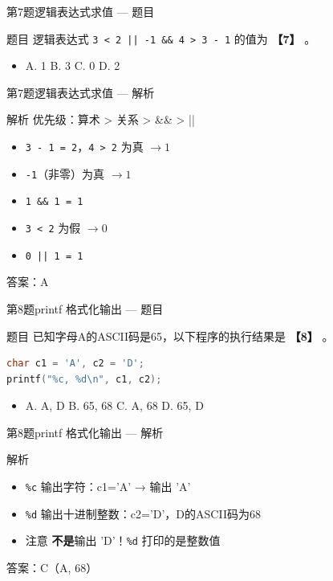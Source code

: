 \begin{frame}{第7题}{逻辑表达式求值 --- 题目}
    \begin{exampleblock}{题目}
        逻辑表达式 \texttt{3 < 2 || -1 \&\& 4 > 3 - 1} 的值为 \textbf{【7】} 。
        \begin{itemize}
            \item A. 1 \quad B. 3 \quad C. 0 \quad D. 2
        \end{itemize}
    \end{exampleblock}
\end{frame}

\begin{frame}{第7题}{逻辑表达式求值 --- 解析}
    \begin{alertblock}{解析}
        \footnotesize 优先级：算术 > 关系 > \&\& > ||
        \begin{itemize}
            \setlength{\itemsep}{0pt}
            \item \texttt{3 - 1 = 2}，\texttt{4 > 2} 为真 $\to 1$
            \item \texttt{-1}（非零）为真 $\to 1$
            \item \texttt{1 \&\& 1 = 1}
            \item \texttt{3 < 2} 为假 $\to 0$
            \item \texttt{0 || 1 = 1}
        \end{itemize}
        {\color{highlight}答案：A}
    \end{alertblock}
\end{frame}

\begin{frame}[fragile]{第8题}{printf 格式化输出 --- 题目}
    \begin{exampleblock}{题目}
        已知字母A的ASCII码是65，以下程序的执行结果是 \textbf{【8】} 。
    \end{exampleblock}

    \begin{lstlisting}[language=C, basicstyle=\footnotesize\ttfamily]
char c1 = 'A', c2 = 'D';
printf("%c, %d\n", c1, c2);
\end{lstlisting}
    \begin{itemize}
        \item A. A, D \quad B. 65, 68 \quad C. A, 68 \quad D. 65, D
    \end{itemize}
\end{frame}

\begin{frame}{第8题}{printf 格式化输出 --- 解析}
    \begin{alertblock}{解析}
        \small
        \begin{itemize}
            \item \texttt{\%c} 输出字符：c1='A' → 输出 'A'
            \item \texttt{\%d} 输出十进制整数：c2='D'，D的ASCII码为68
            \item 注意 \textbf{不是}输出 'D'！\texttt{\%d} 打印的是整数值
        \end{itemize}
        {\color{highlight}答案：C（A, 68）}
    \end{alertblock}
\end{frame}

